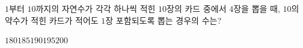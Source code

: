 \hspace*{2mm}\begin{minipage}[t]{\dimexpr\linewidth-2mm\relax}\vspace{0pt}
$1$부터 $10$까지의 자연수가 각각 하나씩 적힌 $10$장의 카드 중에서 $4$장을 뽑을 때, $10$의 약수가 적힌 카드가 적어도 $1$장 포함되도록 뽑는 경우의 수는?
\begin{choices32}{$180$}{$185$}{$190$}{$195$}{$200$}\end{choices32}\end{minipage}
